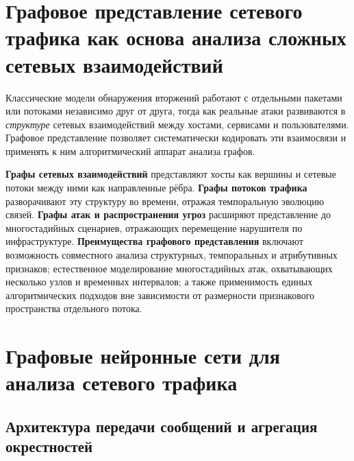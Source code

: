 \section{Графовое представление сетевого трафика как основа анализа сложных сетевых взаимодействий}
\label{sec:graph_representation}

Классические модели обнаружения вторжений работают с отдельными пакетами
или потоками независимо друг от друга, тогда как реальные атаки
развиваются в \emph{структуре} сетевых взаимодействий между хостами,
сервисами и пользователями. Графовое представление позволяет
систематически кодировать эти взаимосвязи и применять к ним
алгоритмический аппарат анализа графов.

\textbf{Графы сетевых взаимодействий} представляют хосты как вершины и
сетевые потоки между ними как направленные рёбра. \textbf{Графы потоков
трафика} разворачивают эту структуру во времени, отражая темпоральную
эволюцию связей. \textbf{Графы атак и распространения угроз} расширяют
представление до многостадийных сценариев, отражающих перемещение
нарушителя по инфраструктуре. \textbf{Преимущества графового
представления} включают возможность совместного анализа структурных,
темпоральных и атрибутивных признаков; естественное моделирование
многостадийных атак, охватывающих несколько узлов и временных интервалов;
а также применимость единых алгоритмических подходов вне зависимости от
размерности признакового пространства отдельного потока.

\section{Графовые нейронные сети для анализа сетевого трафика}
\label{sec:gnn_vulnerability}

\subsection{Архитектура передачи сообщений и агрегация окрестностей}


